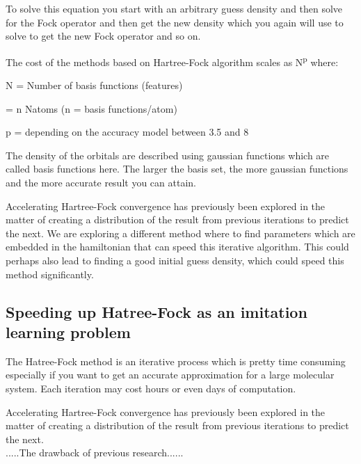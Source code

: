 \documentclass[twoside]{article}
\begin{document}
To solve this equation you start with an arbitrary guess density and then solve for the Fock operator and then get the new density which you again will use to solve to get the new Fock operator and so on. 

The cost of the methods based on Hartree-Fock algorithm scales as N\textsuperscript{p} where: 

N = Number of basis functions (features) 

= n Natoms  (n = basis functions/atom)  

p  = depending on the accuracy model between 3.5 and 8\cite{frisch1996exploring}

The density of the orbitals are described using gaussian functions which are called basis functions here. The larger the basis set, the more gaussian functions and the more accurate result you can attain.

Accelerating Hartree-Fock convergence has previously been explored in the matter of creating a distribution of the result from previous iterations to predict the next\cite{Pulay1980}. We are exploring a different method where to find parameters which are embedded in the hamiltonian that can speed this iterative algorithm. This could perhaps also lead to finding a good initial guess density, which could speed this method significantly. 




\subsection{Speeding up Hatree-Fock as an imitation learning problem}

The Hatree-Fock method is an iterative process which is pretty time consuming especially if you want to get an accurate approximation for a large molecular system. Each iteration may cost hours or even days of computation. 

Accelerating Hartree-Fock convergence has previously been explored in the matter of creating a distribution of the result from previous iterations to predict the next\cite{Pulay1980}.  \\
.....The drawback of previous research......


\end{document}
